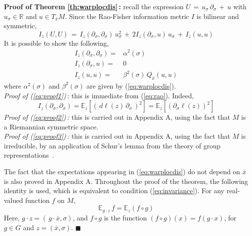 \documentclass{svmult}
\begin{document}
\textbf{Proof of Theorem \ref{th:warplocdis}\,:} 
recall the expression $U \,=\, u_\sigma\,\partial_\sigma\,+\,u$ with $u_\sigma \in \mathbb{R}$ and $u \in T_{\bar{x}}M$. Since the Rao-Fisher information metric $I$ is bilinear and symmetric,
$$
I_z(U,U) \,=\, I_z(\partial_\sigma,\partial_\sigma)\,u^2_\sigma \,+\, 2I_z(\partial_\sigma,u)\,u_\sigma\,+\,I_z(u,u)
$$
It is possible to show the following,
\begin{subequations} \label{eq:proof}
\begin{eqnarray}
\label{eq:proof1} I_z(\partial_\sigma,\partial_\sigma) =& \alpha^2(\sigma) \\[0.12cm]
\label{eq:proof2} I_z(\partial_\sigma,u) =&  0 \\[0.12cm]
\label{eq:proof3} I_z(u,u) =& \beta^2(\sigma)\,Q_{\bar{x}}(u,u)  
\end{eqnarray}
\end{subequations}
where $\alpha^2(\sigma)$ and $\beta^2(\sigma)$ are given by (\ref{eq:warplocdis}). \\[0.1cm]
\textit{Proof of (\ref{eq:proof1})\,:} this is immediate from (\ref{eq:rao}). Indeed, 
$$
I_z(\partial_\sigma,\partial_\sigma) = \mathbb{E}_z\left[\left( \,d\ell(z)\,\partial_\sigma\,\right)^2\right] = \mathbb{E}_z\left[\left(\partial_\sigma\ell(z)\right)^2\right] 
$$
\textit{Proof of (\ref{eq:proof2})\,:} this is carried out in Appendix A, using the fact that $M$ is a Riemannian symmetric space.  \\[0.1cm]
\textit{Proof of (\ref{eq:proof3})\,:} this is carried out in Appendix A, using the fact that $M$ is irreducible, by an application of Schur's lemma from the theory of group representations~\cite{knapp}.

The fact that the expectations appearing in (\ref{eq:warplocdis}) do not depend on $\bar{x}$ is also proved in Appendix A. Throughout the proof of the theorem, the following identity is used, which is equivalent to condition (\ref{eq:invariance}). For any real-valued function $f$ on $M$,
\begin{equation} \label{eq:fcirc}
\mathbb{E}_{g\cdot z} \,f =  \mathbb{E}_z\left(f\circ g\right)
\end{equation}
Here, $g\cdot z = (\,g\cdot \bar{x},\sigma)$, and $f \circ g$ is the function $(f\circ g)(x) = f(g\cdot x)$, for $g \in G$ and $z = (\bar{x},\sigma)$.  \hfill$\blacksquare$





\end{document}
